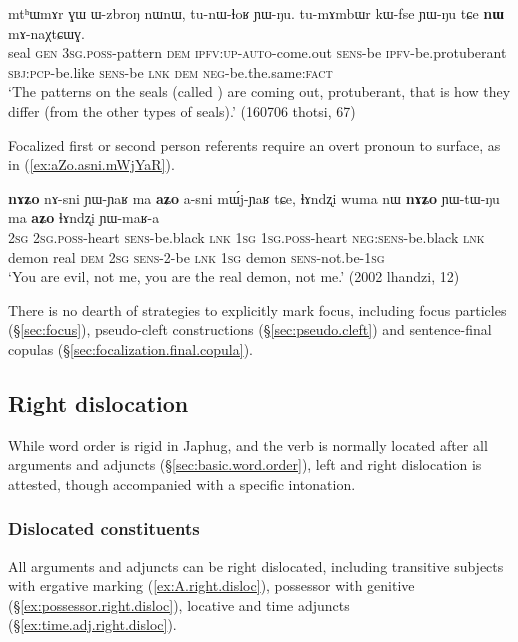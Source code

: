 \begin{exe}
\ex \label{ex:nW.mAnWXtCWG}
\gll mtʰɯmɤr ɣɯ ɯ-zbroŋ nɯnɯ, tu-nɯ-ɬoʁ ɲɯ-ŋu.  tu-mɤmbɯr kɯ-fse ɲɯ-ŋu tɕe \textbf{nɯ} mɤ-naχtɕɯɣ. \\
seal \textsc{gen} \textsc{3sg}.\textsc{poss}-pattern \textsc{dem} \textsc{ipfv}:\textsc{up}-\textsc{auto}-come.out \textsc{sens}-be \textsc{ipfv}-be.protuberant \textsc{sbj}:\textsc{pcp}-be.like \textsc{sens}-be \textsc{lnk} \textsc{dem} \textsc{neg}-be.the.same:\textsc{fact} \\
\glt `The patterns on the seals (called ) are coming out, protuberant, that is how they differ (from the other types of seals).' (160706 thotsi, 67)
\end{exe}

Focalized first or second person referents require an overt pronoun to surface, as in (\ref{ex:aZo.asni.mWjYaR}).

\begin{exe}
\ex \label{ex:aZo.asni.mWjYaR}
\gll \textbf{nɤʑo} nɤ-sni ɲɯ-ɲaʁ ma \textbf{aʑo} a-sni mɯ́j-ɲaʁ tɕe, ɬɤndʐi wuma nɯ \textbf{nɤʑo} ɲɯ-tɯ-ŋu ma \textbf{aʑo} ɬɤndʐi ɲɯ-maʁ-a \\
\textsc{2sg} \textsc{2sg}.\textsc{poss}-heart \textsc{sens}-be.black \textsc{lnk} \textsc{1sg} \textsc{1sg}.\textsc{poss}-heart  \textsc{neg}:\textsc{sens}-be.black \textsc{lnk} demon real \textsc{dem} \textsc{2sg} \textsc{sens}-2-be \textsc{lnk} \textsc{1sg} demon \textsc{sens}-not.be-\textsc{1sg} \\
\glt `You are evil, not me, you are the real demon, not me.' (2002 lhandzi, 12)
\end{exe}

There is no dearth of strategies to explicitly mark focus, including focus particles (§\ref{sec:focus}), pseudo-cleft constructions (§\ref{sec:pseudo.cleft}) and sentence-final copulas (§\ref{sec:focalization.final.copula}).

\subsection{Right dislocation} \label{sec:right.dislocation}
While word order is rigid in Japhug, and the verb is normally located after all arguments and adjuncts (§\ref{sec:basic.word.order}), left and right dislocation is attested, though accompanied with a specific intonation.

\subsubsection{Dislocated constituents}
All arguments and adjuncts can be right dislocated, including transitive subjects with ergative marking (\ref{ex:A.right.disloc}), possessor with genitive (§\ref{ex:possessor.right.disloc}), locative and time adjuncts (§\ref{ex:time.adj.right.disloc}).

